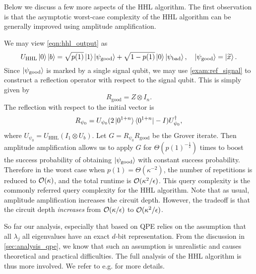 Below we discuss a few more aspects of the HHL algorithm.
The first observation is that the asymptotic worst-case complexity of the HHL algorithm can be generally improved using amplitude amplification.
\begin{rem}
We may view \cref{eqn:hhl_output} as 
\begin{equation}
U_{\mathrm{HHL}}\ket{0}\ket{b}=\sqrt{p(1)}\ket{1}\ket{\psi_{\mathrm{good}}}+\sqrt{1-p(1)}\ket{0}\ket{\psi_{\mathrm{bad}}}, \quad \ket{\psi_{\mathrm{good}}}=\ket{\widetilde{x}}.
\end{equation}
Since $\ket{\psi_{\mathrm{good}}}$ is marked by a single signal qubit, we may use \cref{exam:ref_signal} to construct a reflection operator with respect to the signal qubit. 
This is simply given by
\begin{equation}
R_{\mathrm{good}}=Z\otimes I_n.
\end{equation}
The reflection with respect to the initial vector is
\begin{equation}
R_{\psi_0}=U_{\psi_0}(2\ket{0^{1+n}}\bra{0^{1+n}}-I)U^{\dag}_{\psi_0},
\end{equation}
where $U_{\psi_0}=U_{\mathrm{HHL}}(I_1\otimes U_b)$.
Let $G=R_{\psi_0}R_{\mathrm{good}}$ be the Grover iterate. Then amplitude amplification allows us to apply $G$ for $\Theta(p(1)^{-\frac12})$ times to boost the success probability of obtaining $\ket{\psi_{\mathrm{good}}}$ with constant success probability. Therefore in the worst case when $p(1)=\Theta(\kappa^{-2})$, the number of repetitions is reduced to $\mathcal{O}(\kappa)$, and the total runtime is $\mathcal{O}(\kappa^2/\epsilon)$.
This query complexity is the commonly referred query complexity for the HHL algorithm. Note that as usual, amplitude amplification increases the circuit depth. 
However, the tradeoff is that the circuit depth \emph{increases} from $\mathcal{O}(\kappa/\epsilon)$ to $\mathcal{O}(\kappa^2/\epsilon)$.
\end{rem}

So far our analysis, especially that based on QPE relies on the assumption that all $\lambda_j$ all eigenvalues have an exact $d$-bit representation. From the discussion in \cref{sec:analysis_qpe}, we know that such an assumption is unrealistic and causes theoretical and practical difficulties. 
The full analysis of the HHL algorithm is thus more involved. We refer to e.g. \cite{DervovicHerbsterMountneyEtAl2018} for more details.

